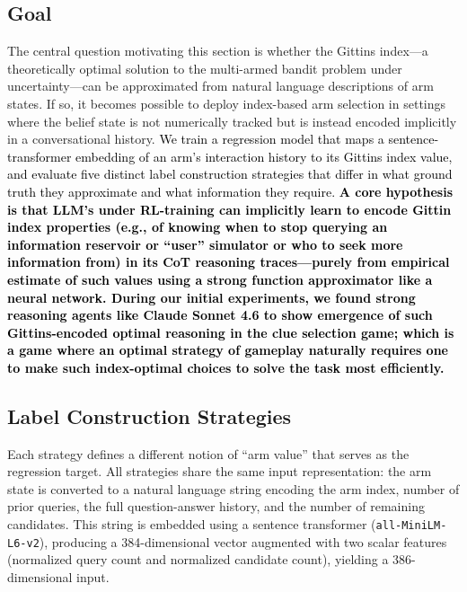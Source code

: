 \documentclass[11pt]{article}
\newcommand{\an}[1]{\textcolor{black}{#1}}
\theoremstyle{plain}
\theoremstyle{definition}
\theoremstyle{remark}
\begin{document}
\subsection{Goal}

The central question motivating this section is whether the Gittins index—a theoretically optimal solution to the multi-armed bandit problem under 
uncertainty—can be approximated from natural language descriptions of arm 
states. If so, it becomes possible to deploy index-based arm selection in 
settings where the belief state is not numerically tracked but is instead 
encoded implicitly in a conversational history. \an{We train a regression model 
that maps a sentence-transformer embedding of an arm's interaction history 
to its Gittins index value, and evaluate five distinct label construction 
strategies that differ in what ground truth they approximate and what 
information they require. \textbf{A core hypothesis is that LLM's under RL-training can implicitly learn to encode Gittin index properties (e.g., of knowing when to stop querying an information reservoir or “user” simulator or who to seek more information from) in its CoT reasoning traces—purely from empirical estimate of such values using a strong function approximator like a neural network. During our initial experiments, we found strong reasoning agents like Claude Sonnet 4.6 to show emergence of such Gittins-encoded optimal reasoning in the clue selection game; which is a game where an optimal strategy of gameplay naturally requires one to make such index-optimal choices to solve the task most efficiently.
}}

\subsection{Label Construction Strategies}

Each strategy defines a different notion of ``arm value'' that serves as 
the regression target. All strategies share the same input representation: 
the arm state is converted to a natural language string encoding the arm 
index, number of prior queries, the full question-answer history, and the 
number of remaining candidates. This string is embedded using a 
sentence transformer (\texttt{all-MiniLM-L6-v2}), producing a 384-dimensional 
vector augmented with two scalar features (normalized query count and 
normalized candidate count), yielding a 386-dimensional input.
\end{document}
